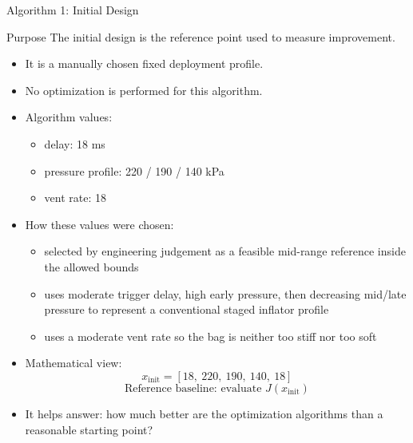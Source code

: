 \documentclass[aspectratio=169]{beamer}
\begin{document}
\begin{frame}{Algorithm 1: Initial Design}
  \small
  \begin{block}{Purpose}
    The initial design is the reference point used to measure improvement.
  \end{block}

  \begin{itemize}
    \item It is a manually chosen fixed deployment profile.
    \item No optimization is performed for this algorithm.
    \item Algorithm values:
    \begin{itemize}
      \item delay: 18 ms
      \item pressure profile: 220 / 190 / 140 kPa
      \item vent rate: 18
    \end{itemize}
    \item How these values were chosen:
    \begin{itemize}
      \item selected by engineering judgement as a feasible mid-range reference inside the allowed bounds
      \item uses moderate trigger delay, high early pressure, then decreasing mid/late pressure to represent a conventional staged inflator profile
      \item uses a moderate vent rate so the bag is neither too stiff nor too soft
    \end{itemize}
    \item Mathematical view:
    \[
    x_{\mathrm{init}} = [18,\ 220,\ 190,\ 140,\ 18]
    \]
    \[
    \text{Reference baseline: evaluate } J(x_{\mathrm{init}})
    \]
    \item It helps answer: how much better are the optimization algorithms than a reasonable starting point?
  \end{itemize}
\end{frame}
\end{document}
